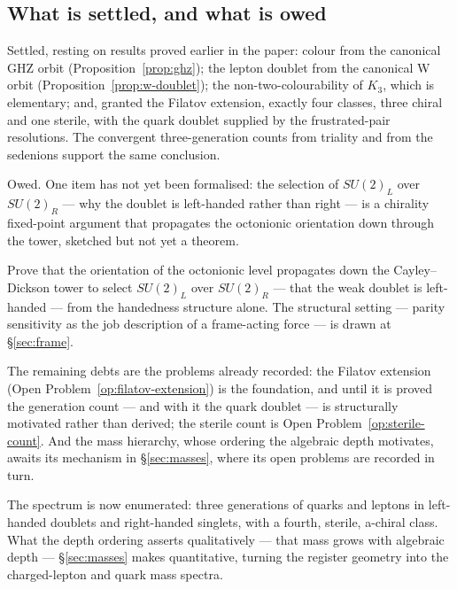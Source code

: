 \subsection{What is settled, and what is owed}

Settled, resting on results proved earlier in the paper: colour from the canonical GHZ orbit
(Proposition~\ref{prop:ghz}); the lepton doublet from the canonical W orbit
(Proposition~\ref{prop:w-doublet}); the non-two-colourability of $K_3$, which is elementary; and,
granted the Filatov extension, exactly four classes, three chiral and one sterile, with the quark
doublet supplied by the frustrated-pair resolutions. The convergent three-generation counts from
triality and from the sedenions support the same conclusion.

Owed. One item has not yet been formalised: the selection of $SU(2)_L$ over $SU(2)_R$ --- why the
doublet is left-handed rather than right --- is a chirality fixed-point argument that propagates the
octonionic orientation down through the tower, sketched but not yet a theorem.

\begin{openproblem}\label{op:chirality}
Prove that the orientation of the octonionic level propagates down the Cayley--Dickson tower to
select $SU(2)_L$ over $SU(2)_R$ --- that the weak doublet is left-handed --- from the handedness
structure alone. The structural setting --- parity sensitivity as the job description of a
frame-acting force --- is drawn at \S\ref{sec:frame}.
\end{openproblem}

The remaining debts are the problems already recorded: the Filatov extension
(Open Problem~\ref{op:filatov-extension}) is the foundation, and until it is proved the generation
count --- and with it the quark doublet --- is structurally motivated rather than derived; the
sterile count is Open Problem~\ref{op:sterile-count}. And the mass hierarchy, whose ordering the
algebraic depth motivates, awaits its mechanism in \S\ref{sec:masses}, where its open problems are
recorded in turn.

The spectrum is now enumerated: three generations of quarks and leptons in left-handed doublets and
right-handed singlets, with a fourth, sterile, a-chiral class. What the depth ordering asserts
qualitatively --- that mass grows with algebraic depth --- \S\ref{sec:masses} makes quantitative,
turning the register geometry into the charged-lepton and quark mass spectra.
